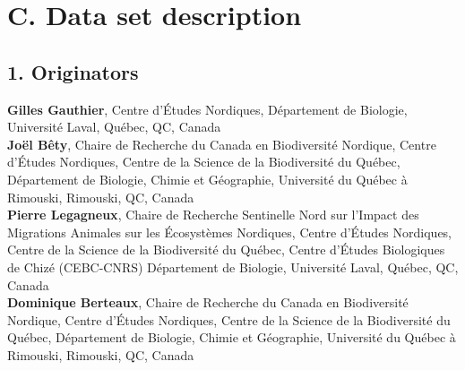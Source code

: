 \documentclass[a4paper,twoside,12pt]{article}
\begin{document}
    \section*{C. Data set description}
                \subsection*{1. Originators}
                \textbf{Gilles Gauthier}, Centre d’Études Nordiques, Département de Biologie, Université Laval, Québec, QC, Canada\\
                \textbf{Joël Bêty},  Chaire de Recherche du Canada en Biodiversité Nordique, Centre d’Études Nordiques, Centre de la Science de la Biodiversité du Québec, Département de Biologie, Chimie et Géographie, Université du Québec à Rimouski, Rimouski, QC, Canada \\
                \textbf{Pierre Legagneux}, Chaire de Recherche Sentinelle Nord sur l’Impact des Migrations Animales sur les Écosystèmes Nordiques, Centre d’Études Nordiques, Centre de la Science de la Biodiversité du Québec, Centre d’Études Biologiques de Chizé (CEBC-CNRS) Département de Biologie, Université Laval, Québec, QC, Canada\\
                \textbf{Dominique Berteaux},  Chaire de Recherche du Canada en Biodiversité Nordique, Centre d’Études Nordiques, Centre de la Science de la Biodiversité du Québec, Département de Biologie, Chimie et Géographie, Université du Québec à Rimouski, Rimouski, QC, Canada \\
                
\end{document}
